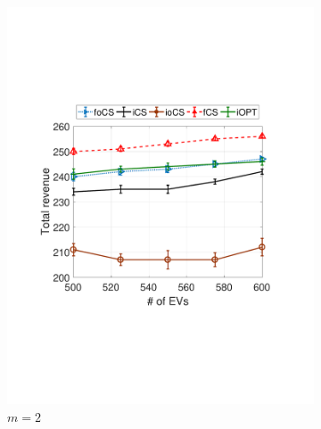 \documentclass[11pt]{article}
\begin{document}
\begin{figure}[t]	
				\centering
				\begin{subfigure}[b]{0.3\textwidth}
					\begin{center}
						\includegraphics[width=\textwidth]{V-NN2.pdf}
						\caption{$m=2$}
						\label{fig:V-NN2}
					\end{center}
				\end{subfigure}
				\begin{subfigure}[b]{0.3\textwidth}
					\begin{center}

\end{center}
\end{subfigure}
\end{figure}
\end{document}
